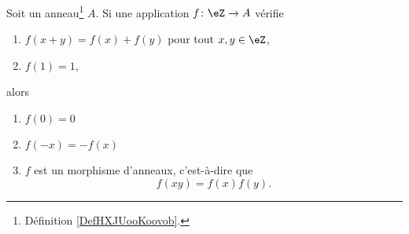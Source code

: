 \begin{lemma}	\label{LEMooILYLooTDRtYj}
	Soit un anneau\footnote{Définition \ref{DefHXJUooKoovob}.} \( A\). Si une application \(f \colon \eZ\to A  \) vérifie
	\begin{enumerate}
		\item
		      \( f(x+y)=f(x)+f(y)\) pour tout \( x,y\in \eZ\),
		\item
		      \( f(1)=1\),
	\end{enumerate}
	alors
	\begin{enumerate}
		\item		\label{ITEMooUQKWooByNDTK}
		      \( f(0)=0\)
		\item	\label{ITEMooYOEPooKOQQPH}
		      \( f(-x)=-f(x)\)
		\item	\label{ITEMooKTSDooExAJHd}
		      \( f\) est un morphisme d'anneaux, c'est-à-dire que
		      \begin{equation}
			      f(xy)=f(x)f(y).
		      \end{equation}
	\end{enumerate}
\end{lemma}

